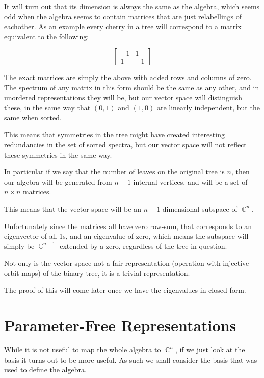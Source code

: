 \documentclass[10pt,a4paper]{report}
\DeclareMathOperator{\C}{\mathds{C}}
\begin{document}
It will turn out that its dimension is always the same as the algebra, which
seems odd when the algebra seems to contain matrices that are just relabellings
of eachother.
As an example every cherry in a tree will correspond to a matrix equivalent to
the following:

\[
	\left[ \begin{matrix}
		-1 & 1\\
		1 & -1
	\end{matrix} \right]
\]

The exact matrices are simply the above with added rows and columns of zero.
The spectrum of any matrix in this form should be the same as any other, and in
unordered representations they will be, but our vector space will
distinguish these, in the same way that $(0, 1)$ and $(1, 0)$ are linearly
independent, but the same when sorted.

This means that symmetries in the tree might have created interesting
redundancies in the set of sorted spectra, but our vector space will not
reflect these symmetries in the same way.

In particular if we say that the number of leaves on the original tree is $n$,
then our algebra will be generated from $n-1$ internal vertices, and will be a set
of $n \times n$ matrices.

This means that the vector space will be an $n-1$ dimensional subspace of
$\C^n$.

Unfortunately since the matrices all have zero row-sum, that corresponds to an
eigenvector of all 1s, and an eigenvalue of zero, which means the subspace will
simply be $\C^{n-1}$ extended by a zero, regardless of the tree in
question.

Not only is the vector space not a fair representation (operation with injective orbit maps) of the binary tree, it
is a trivial representation.

The proof of this will come later once we have the eigenvalues in closed form.

\section{Parameter-Free Representations}

While it is not useful to map the whole algebra to $\C^n$, if we just
look at the basis it turns out to be more useful.
As such we shall consider the basis that was used to define the algebra.
\end{document}
